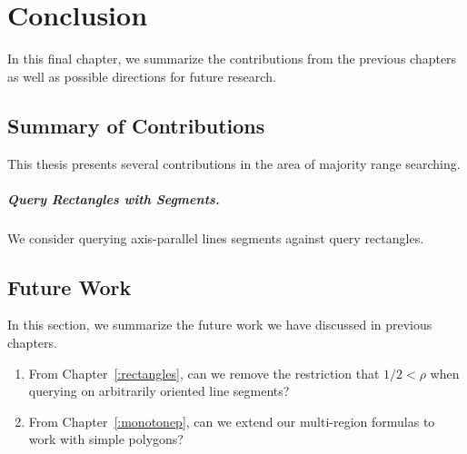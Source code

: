 \chapter{Conclusion}
\label{:conclusion}

In this final chapter, we summarize the contributions from the previous chapters as well as possible directions for future research.

\section{Summary of Contributions}
\label{:conclusion:contributions}

This thesis presents several contributions in the area of majority range searching.

\paragraph{Query Rectangles with Segments.} We consider querying axis-parallel lines segments against query rectangles.



\section{Future Work}
\label{:conclusion:open-problems}

In this section, we summarize the future work we have discussed in previous chapters.

\begin{enumerate}
\item From Chapter~\ref{:rectangles}, can we remove the restriction that $1/2 < \rho$ when querying on arbitrarily oriented line segments?

\item From Chapter~\ref{:monotonep}, can we extend our multi-region formulas to work with simple polygons?

\end{enumerate}
